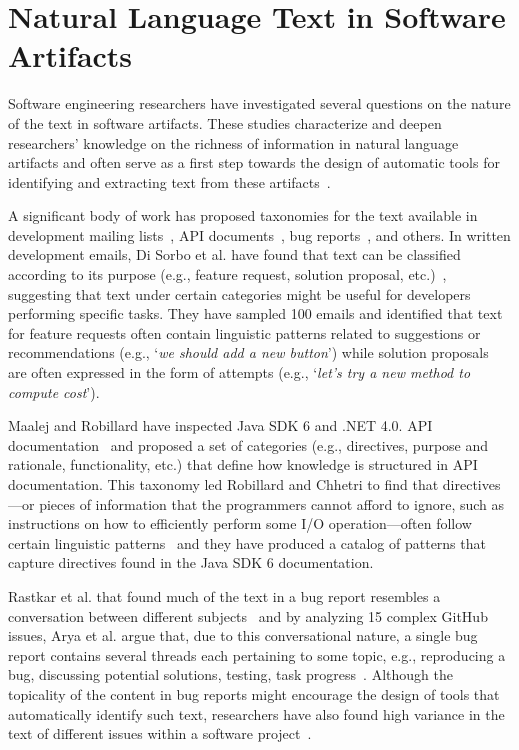 \section{Natural Language Text in Software Artifacts}
\label{cp2:text-in-se}





Software engineering researchers
have investigated several questions on the nature of the text in software artifacts.
These studies 
characterize and deepen
 researchers' knowledge on the richness of information in natural language artifacts
 and often serve as a first step towards the design of automatic tools 
for identifying and extracting text from these artifacts~\cite{Arya2019, Maalej2013}.




A significant body of work has 
 proposed taxonomies for the text available 
 in development mailing lists~\cite{Sorbo2015, huang2018automating},
API documents~\cite{Maalej2013}, bug reports~\cite{Arya2019}, and others.
In written development emails, Di Sorbo et al. have found that 
text can be classified according to its purpose (e.g., feature request, solution proposal, etc.)~\cite{Sorbo2015},
suggesting that text under certain categories might be useful for developers performing specific tasks. 
They have sampled 100 emails and identified that text for feature requests 
often contain linguistic patterns related to suggestions or recommendations 
(e.g., `\textit{we should add a new button}') while solution proposals 
are often expressed in the form of attempts (e.g., `\textit{let's try a new method to compute cost}').



Maalej and Robillard have inspected Java SDK 6 and .NET 4.0. API documentation~\cite{Maalej2013}
and proposed a set of categories (e.g., directives, purpose and rationale, functionality, etc.) that define how 
knowledge is structured in API documentation. 
This taxonomy led Robillard and Chhetri 
to find that directives---or pieces of information that the programmers
cannot afford to ignore, such as instructions on how to efficiently
perform some I/O operation---often 
follow certain linguistic patterns~\cite{Robillard2015}
and they have produced a catalog of patterns that capture directives found in the 
Java SDK 6 documentation.



Rastkar et al. that found much of the text in a bug report resembles a 
conversation between different subjects~\cite{Rastkar2013} 
and by analyzing 15 complex GitHub issues, Arya et al. argue that, due to this conversational nature, 
a single bug report contains several threads each 
pertaining to some topic, e.g., 
reproducing a bug, discussing potential solutions, 
testing, task progress~\cite{Arya2019}. 
Although the topicality of the content in bug reports 
might encourage the design of tools that automatically identify such
text, researchers have also found high variance in the text of different 
issues within a software project~\cite{Chaparro2016}.



